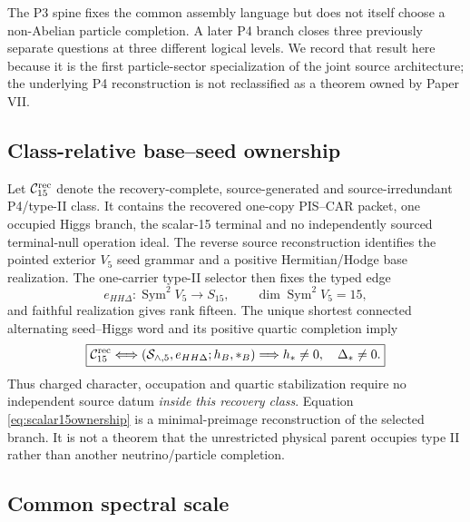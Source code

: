 \documentclass[11pt]{article}
\begin{document}
The P3 spine fixes the common assembly language but does not itself choose a
non-Abelian particle completion.  A later P4 branch closes three previously
separate questions at three different logical levels.  We record that result
here because it is the first particle-sector specialization of the joint
source architecture; the underlying P4 reconstruction is not reclassified as
a theorem owned by Paper VII.

\subsection{Class-relative base--seed ownership}

Let \(\mathcal C_{15}^{\rm rec}\) denote the recovery-complete,
source-generated and source-irredundant P4/type-II class.  It contains the
recovered one-copy PIS--CAR packet, one occupied Higgs branch, the scalar-15
terminal and no independently sourced terminal-null operation ideal.  The
reverse source reconstruction identifies the pointed exterior \(V_5\) seed
grammar and a positive Hermitian/Hodge base realization.  The one-carrier
type-II selector then fixes the typed edge
\begin{equation}
 e_{HH\Delta}:\operatorname{Sym}^2V_5\longrightarrow S_{15},
 \qquad \dim\operatorname{Sym}^2V_5=15,
 \label{eq:scalar15edge}
\end{equation}
and faithful realization gives rank fifteen.  The unique shortest connected
alternating seed--Higgs word and its positive quartic completion imply
\begin{equation}
 \boxed{
 \mathcal C_{15}^{\rm rec}
 \Longleftrightarrow
 (\mathcal S_{\wedge,5},e_{HH\Delta};h_B,*_B)
 \Longrightarrow h_*\ne0,\quad\Delta_*\ne0 .}
 \label{eq:scalar15ownership}
\end{equation}
Thus charged character, occupation and quartic stabilization require no
independent source datum \emph{inside this recovery class}.  Equation
\eqref{eq:scalar15ownership} is a minimal-preimage reconstruction of the
selected branch.  It is not a theorem that the unrestricted physical parent
occupies type II rather than another neutrino/particle completion.

\subsection{Common spectral scale}
\end{document}
